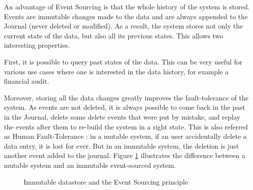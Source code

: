 An advantage of Event Sourcing is that the whole history of the system is stored. Events are immutable changes made to the data
and are always appended to the Journal (never deleted or modified). As a result, the system stores not only the current state
of the data, but also all its previous states. This allows two interesting properties.

First, it is possible to query past states of the data. This can be very useful for various use cases
where one is interested in the data history, for example a financial audit.

Moreover, storing all the data changes greatly improves the fault-tolerance of the system. As events are not deleted, it is always possible 
to come back in the past in the Journal, delete some delete events that were put by mistake, and replay the events after
them to re-build the system in a right state. This is also referred as Human Fault-Tolerance : in a mutable system,
if an user accidentally delete a data entry, it is lost for ever. But in an immutable system, the deletion is just another
event added to the journal. Figure \ref{fig:event-sourcing} illustrates the difference between a mutable system and an immutable event-sourced system.
\\ 
\begin{figure}[h]
  \begin{center}
    \caption{Immutable datastore and the Event Sourcing principle}
    \label{fig:event-sourcing}
  \end{center}
\end{figure}

